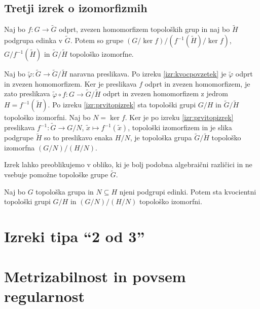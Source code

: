 \documentclass[mat1]{fmfdelo}
\begin{document}
\subsection{Tretji izrek o izomorfizmih}
\begin{izrek}\label{izr:predtretji}
	Naj bo $f\colon G \to \widetilde{G}$ odprt, zvezen homomorfizem topoloških grup in naj bo $\widetilde{H}$ podgrupa edinka v $\widetilde{G}$. Potem so grupe $(G/\ker f)/(f^{-1}(\widetilde{H})/\ker f)$, $G/f^{-1}(\widetilde{H})$ in $\widetilde{G}/\widetilde{H}$ topološko izomorfne.
\end{izrek}

\begin{dokaz}
Naj bo $\tilde{\varphi}\colon \widetilde{G} \to \widetilde{G}/\widetilde{H}$ naravna preslikava. Po izreku \ref{izr:kvocpovzetek} je $\tilde{\varphi}$ odprt in zvezen homomorfizem. Ker je preslikava $f$ odprt in zvezen homomorfizem, je zato preslikava $\tilde{\varphi}\circ f\colon G \to \widetilde{G}/\widetilde{H}$ odprt in zvezen homomorfizem z jedrom $H = f^{-1}(\widetilde{H})$. Po izreku \ref{izr:prvitopizrek} sta topološki grupi $G/H$ in $\widetilde{G}/\widetilde{H}$ topološko izomorfni. Naj bo $N = \ker f$. Ker je po izreku \ref{izr:prvitopizrek} preslikava $f^{-1}\colon \widetilde{G} \to G/N$, $\tilde{x} \mapsto f^{-1}(\tilde{x})$, topološki izomorfizem in je slika podgrupe $\widetilde{H}$ so to preslikavo enaka $H/N$, je topološka grupa $\widetilde{G}/\widetilde{H}$ topološko izomorfna $(G/N)/(H/N)$.
\end{dokaz}

Izrek lahko preoblikujemo v obliko, ki je bolj podobna algebraični različici in ne vsebuje pomožne topološke grupe $\widetilde{G}$.
\begin{izrek}\label{izr:tretjitopizrek}
Naj bo $G$ topološka grupa in $N \subseteq H$ njeni podgrupi edinki. Potem sta kvocientni topološki grupi $G/H$ in $(G/N)/(H/N)$ topološko izomorfni.
\end{izrek}

\section{Izreki tipa ``2 od 3''}

\section{Metrizabilnost in povsem regularnost}
\end{document}

